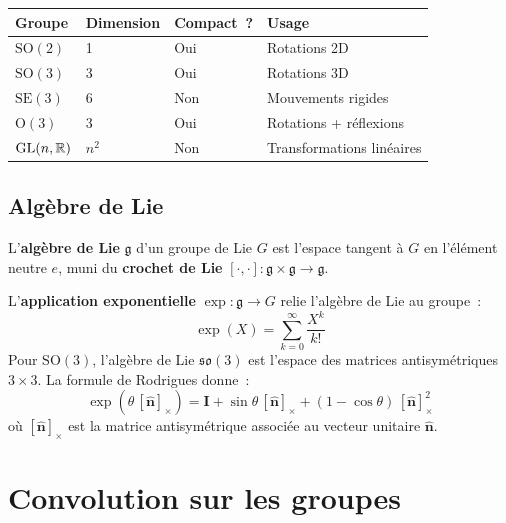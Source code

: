 \begin{exemple}
\begin{center}
\begin{tabular}{llll}
\toprule
\textbf{Groupe} & \textbf{Dimension} & \textbf{Compact~?} & \textbf{Usage} \\
\midrule
$\mathrm{SO}(2)$ & 1 & Oui & Rotations 2D \\
$\mathrm{SO}(3)$ & 3 & Oui & Rotations 3D \\
$\mathrm{SE}(3)$ & 6 & Non & Mouvements rigides \\
$\mathrm{O}(3)$ & 3 & Oui & Rotations + r\'eflexions \\
$\mathrm{GL}(n, \mathbb{R})$ & $n^2$ & Non & Transformations lin\'eaires \\
\bottomrule
\end{tabular}
\end{center}
\end{exemple}

\subsection{Alg\`ebre de Lie}

\begin{definition}
L'\textbf{alg\`ebre de Lie} $\mathfrak{g}$ d'un groupe de Lie $G$ est l'espace
tangent \`a $G$ en l'\'el\'ement neutre $e$, muni du \textbf{crochet de Lie}
$[\cdot, \cdot]: \mathfrak{g} \times \mathfrak{g} \to \mathfrak{g}$.
\end{definition}

\begin{formules}[title=\textbf{Application exponentielle}]
L'\textbf{application exponentielle} $\exp: \mathfrak{g} \to G$ relie
l'alg\`ebre de Lie au groupe~:
\[
    \exp(X) = \sum_{k=0}^{\infty} \frac{X^k}{k!}
\]
Pour $\mathrm{SO}(3)$, l'alg\`ebre de Lie $\mathfrak{so}(3)$ est l'espace des
matrices antisym\'etriques $3 \times 3$. La formule de Rodrigues donne~:
\[
    \exp(\theta\, [\hat{\mathbf{n}}]_\times) = \mathbf{I} + \sin\theta\,
    [\hat{\mathbf{n}}]_\times + (1 - \cos\theta)\, [\hat{\mathbf{n}}]_\times^2
\]
o\`u $[\hat{\mathbf{n}}]_\times$ est la matrice antisym\'etrique associ\'ee au
vecteur unitaire $\hat{\mathbf{n}}$.
\end{formules}

\section{Convolution sur les groupes}

